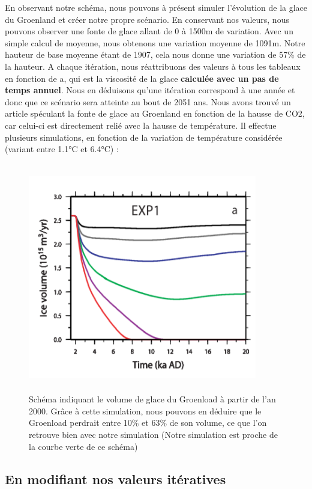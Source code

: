 \documentclass{article}
\begin{document}
En observant notre schéma, nous pouvons à présent simuler l'évolution de la glace du Groenland et créer notre propre scénario. En conservant nos valeurs, nous pouvons observer une fonte de glace allant de 0 à 1500m de variation. Avec un simple calcul de moyenne, nous obtenons une variation moyenne de 1091m. Notre hauteur de base moyenne étant de 1907, cela nous donne une variation de 57\% de la hauteur. A chaque itération, nous réattribuons des valeurs à tous les tableaux en fonction de a, qui est la viscosité de la glace \textbf{calculée avec un pas de temps annuel}. Nous en déduisons qu'une itération correspond à une année et donc que ce scénario sera atteinte au bout de 2051 ans. 
\newpage
Nous avons trouvé un article \cite{charbit2008amount} spéculant la fonte de glace au Groenland en fonction de la hausse de CO2, car celui-ci est directement relié avec la hausse de température. Il effectue plusieurs simulations, en fonction de la variation de température considérée (variant entre 1.1°C et 6.4°C) : 
\begin{figure}[!htpb]
\centering
\includegraphics[width=10cm, keepaspectratio=true, height=10cm]{Variation.png}
\caption{Schéma indiquant le volume de glace du Groenload à partir de l'an 2000. Grâce à cette simulation, nous pouvons en déduire que le Groenload perdrait entre 10\% et 63\% de son volume, ce que l'on retrouve bien avec notre simulation (Notre simulation est proche de la courbe verte de ce schéma) }
\end{figure}
\newpage
\subsection{En modifiant nos valeurs itératives}
\end{document}
